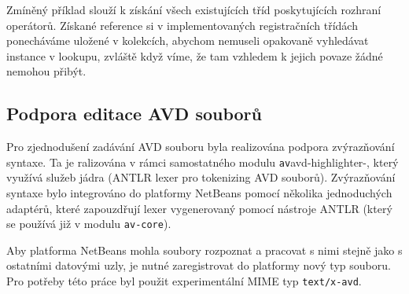 Zmíněný příklad slouží k získání všech existujících tříd poskytujících rozhraní operátorů. Získané reference si v implementovaných registračních třídách ponecháváme uložené v kolekcích, abychom nemuseli opakovaně vyhledávat instance v lookupu, zvláště když víme, že tam vzhledem k jejich povaze žádné nemohou přibýt.

\subsection{Podpora editace AVD souborů}
Pro zjednodušení zadávání AVD souboru byla realizována podpora zvýrazňování syntaxe. Ta je ralizována v rámci samostatného modulu \verb-av-avd-highlighter-, který využívá služeb jádra (ANTLR lexer pro tokenizing AVD souborů). Zvýrazňování syntaxe bylo integrováno do platformy NetBeans pomocí několika jednoduchých adaptérů, které zapouzdřují lexer vygenerovaný pomocí nástroje ANTLR (který se používá již v modulu \verb+av-core+).

Aby platforma NetBeans mohla soubory rozpoznat a pracovat s nimi stejně jako s ostatními datovými uzly, je nutné zaregistrovat do platformy nový typ souboru. Pro potřeby této práce byl použit experimentální MIME typ \verb+text/x-avd+.
